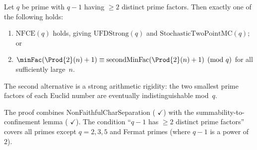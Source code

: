 \begin{theorem}
\label{thm:kernel-dichotomy}
Let $q$ be prime with $q - 1$ having $\geq 2$ distinct prime factors.
Then exactly one of the following holds:
\begin{enumerate}[nosep]
\item $\mathrm{NFCE}(q)$ holds, giving
  $\mathrm{UFDStrong}(q)$ and $\mathrm{StochasticTwoPointMC}(q)$; or
\item $\minFac(\Prod{2}(n)+1) \equiv \operatorname{secondMinFac}(\Prod{2}(n)+1) \pmod{q}$
  for all sufficiently large~$n$.
\end{enumerate}
The second alternative is a strong arithmetic rigidity: the two
smallest prime factors of each Euclid number are eventually
indistinguishable mod~$q$.
\end{theorem}

\noindent
The proof combines NonFaithfulCharSeparation
(
{\color{leanink}$\checkmark$})
with the summability-to-confinement lemma
(
{\color{leanink}$\checkmark$}).
The condition ``$q{-}1$ has $\geq 2$ distinct prime factors'' covers
all primes except $q = 2, 3, 5$ and Fermat primes (where $q{-}1$ is a
power of~$2$).

